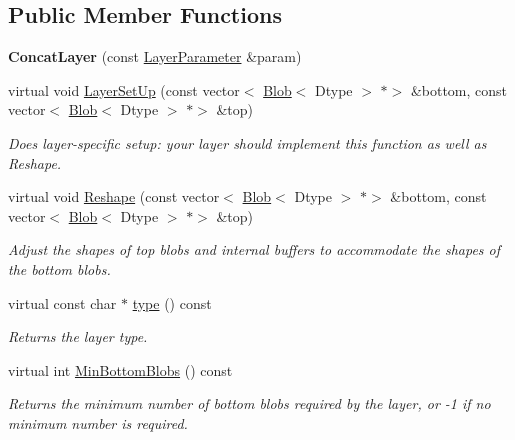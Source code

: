 \subsection*{Public Member Functions}
\begin{DoxyCompactItemize}
\item 
\mbox{\label{classcaffe_1_1_concat_layer_aa06930bae7ed23c88546f35323e1792d}} 
{\bfseries Concat\+Layer} (const \mbox{\hyperlink{classcaffe_1_1_layer_parameter}{Layer\+Parameter}} \&param)
\item 
virtual void \mbox{\hyperlink{classcaffe_1_1_concat_layer_af4fc13f4977f84a30af260096ffd55d2}{Layer\+Set\+Up}} (const vector$<$ \mbox{\hyperlink{classcaffe_1_1_blob}{Blob}}$<$ Dtype $>$ $\ast$$>$ \&bottom, const vector$<$ \mbox{\hyperlink{classcaffe_1_1_blob}{Blob}}$<$ Dtype $>$ $\ast$$>$ \&top)
\begin{DoxyCompactList}\small\item\em Does layer-\/specific setup\+: your layer should implement this function as well as Reshape. \end{DoxyCompactList}\item 
virtual void \mbox{\hyperlink{classcaffe_1_1_concat_layer_a3c7cbd500d3a15cfbdbf33479c4fb228}{Reshape}} (const vector$<$ \mbox{\hyperlink{classcaffe_1_1_blob}{Blob}}$<$ Dtype $>$ $\ast$$>$ \&bottom, const vector$<$ \mbox{\hyperlink{classcaffe_1_1_blob}{Blob}}$<$ Dtype $>$ $\ast$$>$ \&top)
\begin{DoxyCompactList}\small\item\em Adjust the shapes of top blobs and internal buffers to accommodate the shapes of the bottom blobs. \end{DoxyCompactList}\item 
\mbox{\label{classcaffe_1_1_concat_layer_a3e7f83937180cbf11c60146b44b1a044}} 
virtual const char $\ast$ \mbox{\hyperlink{classcaffe_1_1_concat_layer_a3e7f83937180cbf11c60146b44b1a044}{type}} () const
\begin{DoxyCompactList}\small\item\em Returns the layer type. \end{DoxyCompactList}\item 
virtual int \mbox{\hyperlink{classcaffe_1_1_concat_layer_a314de9eb00a296ffd3cf84120bd1601e}{Min\+Bottom\+Blobs}} () const
\begin{DoxyCompactList}\small\item\em Returns the minimum number of bottom blobs required by the layer, or -\/1 if no minimum number is required. \end{DoxyCompactList}\item 

\end{DoxyCompactItemize}

